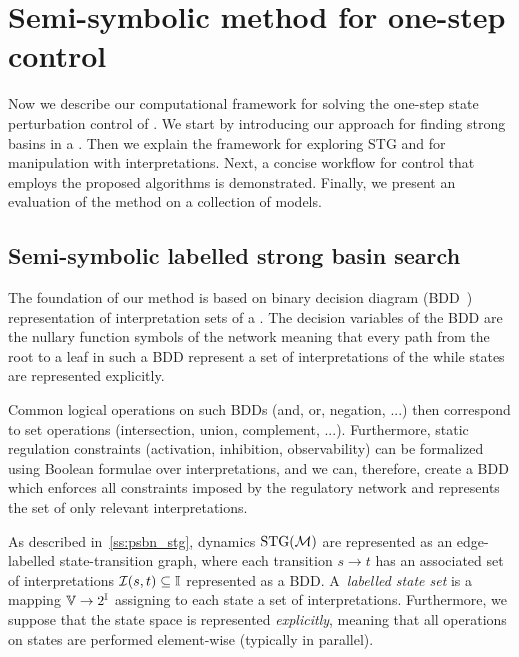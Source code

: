 \section{Semi-symbolic method for one-step control}
\label{sec:target_semisymbolic}

Now we describe our computational framework for solving the one-step state perturbation control of \PBN{}. We start by introducing our approach for finding strong basins in a \PBN{}. Then we explain the framework for exploring \PBN{} STG and for manipulation with \PBN{} interpretations. Next, a concise workflow for \PBN{} control that employs the proposed algorithms is demonstrated. Finally, we present an evaluation of the method on a collection of \PBN{} models. 

\subsection{Semi-symbolic labelled strong basin search}
\label{ss:semi_symbolic_sb}

The foundation of our method is based on binary decision diagram (BDD~\cite{Bryant86}) representation of interpretation sets of a \PBN{}. The decision variables of the BDD are the nullary function symbols of the network meaning that every path from the root to a leaf in such a BDD represent a set of interpretations of the \PBN{} while states are represented explicitly.

Common logical operations on such BDDs (and, or, negation, ...) then correspond to set operations (intersection, union, complement, ...).  Furthermore, static regulation constraints (activation, inhibition, observability) can be formalized using Boolean formulae over interpretations, and we can, therefore, create a BDD which enforces all constraints imposed by the regulatory network and represents the set of only relevant interpretations.

As described in~\autoref{ss:psbn_stg}, \PBN{} dynamics $\text{\upshape STG}(\mathcal{M}{})$ are represented as an edge-labelled state-transition graph, where each transition $s \to t$ has an associated set of interpretations $\mathcal{I}(s, t) \subseteq \mathbb{I}$ represented as a BDD. A~\emph{labelled state set} is a mapping $\mathbb{V} \to 2^{\mathbb{I}}$ assigning to each state a set of interpretations. Furthermore, we suppose that the state space is represented \emph{explicitly}, meaning that all operations on states are performed element-wise (typically in parallel).

